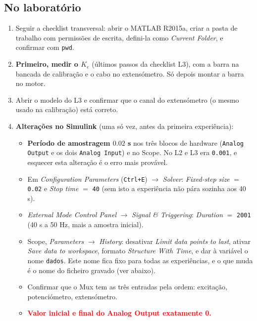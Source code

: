 \documentclass[a4paper,11pt]{article}
\begin{document}
\subsection*{No laboratório}

\begin{enumerate}[label=$\square$, leftmargin=1.5em]
  \item Seguir a checklist transversal: abrir o MATLAB R2015a, criar a pasta de trabalho com permissões de escrita, defini-la como \emph{Current Folder}, e confirmar com \texttt{pwd}.

  \item \textbf{Primeiro, medir o $K_e$} (últimos passos da checklist L3), com a barra na bancada de calibração e o cabo no extensómetro.
  Só depois montar a barra no motor.

  \item Abrir o modelo do L3 e confirmar que o canal do extensómetro (o mesmo usado na calibração) está correto.

  \item \textbf{Alterações no Simulink} (uma só vez, antes da primeira experiência):
  \begin{itemize}
    \item \textbf{Período de amostragem $0.02$ s} nos três blocos de hardware (\texttt{Analog Output} e os dois \texttt{Analog Input}) e no Scope.
    No L2 e L3 era \texttt{0.001}, e esquecer esta alteração é o erro mais provável.
    \item Em \emph{Configuration Parameters} (\texttt{Ctrl+E}) $\to$ \emph{Solver}: \emph{Fixed-step size} $=$ \texttt{0.02} e \emph{Stop time} $=$ \texttt{40} (sem isto a experiência não pára sozinha aos 40\,s).
    \item \emph{External Mode Control Panel} $\to$ \emph{Signal \& Triggering}: \emph{Duration} $=$ \texttt{2001} (40 s a 50 Hz, mais a amostra inicial).
    \item Scope, \emph{Parameters} $\to$ \emph{History}: desativar \emph{Limit data points to last}, ativar \emph{Save data to workspace}, formato \emph{Structure With Time}, e dar à variável o nome \texttt{dados}.
    Este nome fica fixo para todas as experiências, e o que muda é o nome do ficheiro gravado (ver abaixo).
    \item Confirmar que o Mux tem as três entradas pela ordem: excitação, potenciómetro, extensómetro.
    \item \textcolor{red}{\textbf{Valor inicial e final do Analog Output exatamente 0.}}
  \end{itemize}


\end{enumerate}
\end{document}
